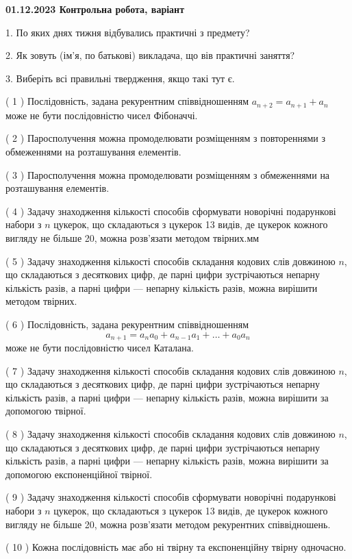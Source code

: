 \documentclass[12pt, ukrainian]{article}
\begin{document}
\vspace{4mm}
\newpage
\begin {large}

\textbf{01.12.2023 Контрольна робота, варіант  }\par


{
1. По яких днях тижня відбувались практичні з предмету?



\vspace{5mm}
2. Як зовуть (ім'я, по батькові) викладача, що вів практичні заняття?



\vspace{5mm}
3. Виберіть всі правильні твердження, якщо такі тут є.\par
\vspace{2mm}
( 1 ) Послідовність, задана рекурентним співвідношенням $a_{n+2}=a_{n+1}+a_{n}$ може не бути послідовністю чисел Фібоначчі.%

( 2 ) Паросполучення можна промоделювати розміщенням з повтореннями з обмеженнями на розташування елементів.%

( 3 ) Паросполучення можна промоделювати розміщенням з обмеженнями на розташування елементів.%

( 4 ) Задачу знаходження кількості способів сформувати новорічні подарункові набори з $n$ цукерок, що складаються з цукерок 13 видів, де цукерок кожного вигляду не більше 20, можна розв’язати методом твірних.мм%

( 5 ) Задачу знаходження кількості способів складання кодових слів довжиною $n$, що складаються з десяткових цифр, де парні цифри зустрічаються непарну кількість разів, а парні цифри — непарну кількість разів, можна вирішити методом твірних.%

( 6 ) Послідовність, задана рекурентним співвідношенням $$a_{n+1}=a_{n}a_{0}+a_{n-1}a_{1}+\ldots+a_0a_{n}$$ може не бути послідовністю чисел Каталана.%

( 7 ) Задачу знаходження кількості способів складання кодових слів довжиною $n$, що складаються з десяткових цифр, де парні цифри зустрічаються непарну кількість разів, а парні цифри — непарну кількість разів, можна вирішити за допомогою твірної.%

( 8 ) Задачу знаходження кількості способів складання кодових слів довжиною $n$, що складаються з десяткових цифр, де парні цифри зустрічаються непарну кількість разів, а парні цифри — непарну кількість разів, можна вирішити за допомогою експоненційної твірної.%

( 9 ) Задачу знаходження кількості способів сформувати новорічні подарункові набори з $n$ цукерок, що складаються з цукерок 13 видів, де цукерок кожного вигляду не більше 20, можна розв’язати методом рекурентних співвідношень.%

( 10 ) Кожна послідовність має або ні твірну та експоненційну твірну одночасно.%
}
\end {large}
\end{document}
